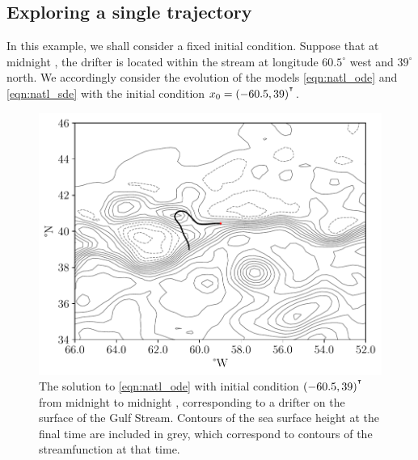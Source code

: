 


\subsection{Exploring a single trajectory}
In this example, we shall consider a fixed initial condition.
Suppose that at midnight , the drifter is located within the stream  at longitude \(60.5^\circ\) west and \(39^\circ\) north.
We accordingly consider the evolution of the models \cref{eqn:natl_ode} and \cref{eqn:natl_sde} with the initial condition \(x_0 = (-60.5, 39)^{^{\intercal}}\).

\begin{figure}
	\begin{center}
		\includegraphics[width=\textwidth]{chp06_applications/figures/gulf_stream/det_traj.pdf}
		\caption{The solution to \cref{eqn:natl_ode} with initial condition \((-60.5, 39)^{^{\intercal}}\) from midnight  to midnight , corresponding to a drifter on the surface of the Gulf Stream.
			Contours of the sea surface height at the final time are included in grey, which correspond to contours of the streamfunction at that time.}
		\label{fig:natl_det_traj}
	\end{center}
\end{figure}

